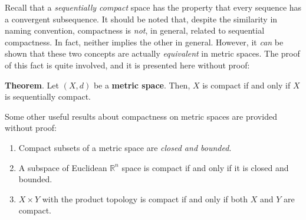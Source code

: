 Recall that a \textit{sequentially compact} space has the property that every sequence has a convergent subsequence. It should be noted that, despite the similarity in naming convention, compactness is \textit{not}, in general, related to sequential compactness. In fact, neither implies the other in general. However, it \textit{can} be shown that these two concepts are actually \textit{equivalent} in metric spaces. The proof of this fact is quite involved, and it is presented here without proof:

\textbf{Theorem}. Let $(X,d)$ be a \textbf{metric space}. Then, $X$ is compact if and only if $X$ is sequentially compact.

Some other useful results about compactness on metric spaces are provided without proof:
\vspace{-1em}
\begin{enumerate}
    \item[-] Compact subsets of a metric space are \textit{closed and bounded}.
    \item[-] A subspace of Euclidean $\mathbb{R}^n$ space is compact if and only if it is closed and bounded.
    \item[-] $X\times Y$ with the product topology is compact if and only if both $X$ and $Y$ are compact.
\end{enumerate}

